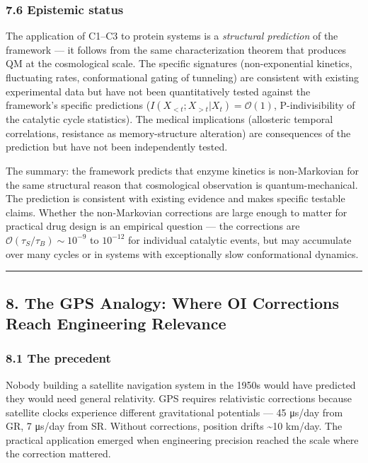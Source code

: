 \documentclass[
]{article}
\begin{document}
\hypertarget{epistemic-status}{%
\subsubsection{7.6 Epistemic status}\label{epistemic-status}}

The application of C1--C3 to protein systems is a \emph{structural
prediction} of the framework --- it follows from the same
characterization theorem that produces QM at the cosmological scale. The
specific signatures (non-exponential kinetics, fluctuating rates,
conformational gating of tunneling) are consistent with existing
experimental data but have not been quantitatively tested against the
framework's specific predictions
(\(I(X_{<t}; X_{>t} | X_t) = \mathcal{O}(1)\), P-indivisibility of the
catalytic cycle statistics). The medical implications (allosteric
temporal correlations, resistance as memory-structure alteration) are
consequences of the prediction but have not been independently tested.

The summary: the framework predicts that enzyme kinetics is
non-Markovian for the same structural reason that cosmological
observation is quantum-mechanical. The prediction is consistent with
existing evidence and makes specific testable claims. Whether the
non-Markovian corrections are large enough to matter for practical drug
design is an empirical question --- the corrections are
\(\mathcal{O}(\tau_S / \tau_B) \sim 10^{-9}\) to \(10^{-12}\) for
individual catalytic events, but may accumulate over many cycles or in
systems with exceptionally slow conformational dynamics.

\begin{center}\rule{0.5\linewidth}{0.5pt}\end{center}

\hypertarget{the-gps-analogy-where-oi-corrections-reach-engineering-relevance}{%
\subsection{8. The GPS Analogy: Where OI Corrections Reach Engineering
Relevance}\label{the-gps-analogy-where-oi-corrections-reach-engineering-relevance}}

\hypertarget{the-precedent}{%
\subsubsection{8.1 The precedent}\label{the-precedent}}

Nobody building a satellite navigation system in the 1950s would have
predicted they would need general relativity. GPS requires relativistic
corrections because satellite clocks experience different gravitational
potentials --- 45 μs/day from GR, 7 μs/day from SR. Without corrections,
position drifts \textasciitilde10 km/day. The practical application
emerged when engineering precision reached the scale where the
correction mattered.
\end{document}
